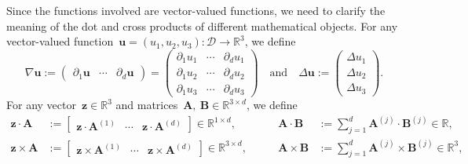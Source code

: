 \documentclass[11pt,reqno]{amsart}
\theoremstyle{definition}
\numberwithin{equation}{section}
\newcommand{\bff}{\boldsymbol}
\newcommand{\bb}{\mathbb}
\newcommand{\pa}{\partial}
\begin{document}
Since the functions involved are vector-valued functions, we need to clarify
the meaning of the dot and cross products of different mathematical objects. For any vector-valued function~$\bff{u}=(u_1,u_2,u_3):\mathscr{D}\to\bb{R}^3$, we define
\begin{equation*}\label{equ:dot cro}
	\nabla\bff{u}
	:=
	\begin{pmatrix}
		\pa_1 \bff{u} & \cdots & \pa_d \bff{u}
	\end{pmatrix}
	=
	\begin{pmatrix}
		\pa_1 u_1 & \cdots & \pa_d u_1
		\\
		\pa_1 u_2 & \cdots & \pa_d u_2
		\\
		\pa_1 u_3 & \cdots & \pa_d u_3
	\end{pmatrix}
	\quad\text{and}\quad
	\Delta\bff{u}
	:=
	\begin{pmatrix}
		\Delta u_1 \\ \Delta u_2 \\ \Delta u_3
	\end{pmatrix}.
\end{equation*}
For any vector~$\bff{z}\in\bb{R}^3$ and matrices~$\bff{A}, \ \bff{B}\in\bb{R}^{3\times d}$, we
define
\begin{equation*}\label{equ:dot cro 2}
	\begin{alignedat}{2}
		\bff{z}\cdot\bff{A} &:=
		\begin{bmatrix}
			\bff{z}\cdot\bff{A}^{(1)} & \cdots & \bff{z}\cdot\bff{A}^{(d)}
		\end{bmatrix}
		\in\bb{R}^{1\times d},
		\quad&
		\bff{A} \cdot \bff{B}
		&:=
		\sum_{j=1}^d \bff{A}^{(j)} \cdot \bff{B}^{(j)}
		\in\bb{R},
		\\
		\bff{z}\times\bff{A}
		&:=
		\begin{bmatrix}
			\bff{z}\times\bff{A}^{(1)} & \cdots & \bff{z}\times\bff{A}^{(d)}
		\end{bmatrix}
		\in\bb{R}^{3\times d},
		\qquad&
		\bff{A} \times \bff{B}
		&:=
		\sum_{j=1}^d \bff{A}^{(j)} \times \bff{B}^{(j)}
		\in\bb{R}^3,
	\end{alignedat}
\end{equation*}
\end{document}
